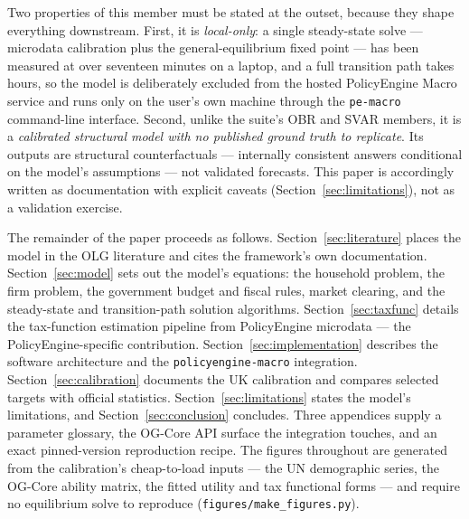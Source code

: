 Two properties of this member must be stated at the outset, because they shape everything downstream. First, it is \emph{local-only}: a single steady-state solve --- microdata calibration plus the general-equilibrium fixed point --- has been measured at over seventeen minutes on a laptop, and a full transition path takes hours, so the model is deliberately excluded from the hosted PolicyEngine Macro service and runs only on the user's own machine through the \texttt{pe-macro} command-line interface. Second, unlike the suite's OBR and SVAR members, it is a \emph{calibrated structural model with no published ground truth to replicate}. Its outputs are structural counterfactuals --- internally consistent answers conditional on the model's assumptions --- not validated forecasts. This paper is accordingly written as documentation with explicit caveats (Section~\ref{sec:limitations}), not as a validation exercise.

The remainder of the paper proceeds as follows. Section~\ref{sec:literature} places the model in the OLG literature and cites the framework's own documentation. Section~\ref{sec:model} sets out the model's equations: the household problem, the firm problem, the government budget and fiscal rules, market clearing, and the steady-state and transition-path solution algorithms. Section~\ref{sec:taxfunc} details the tax-function estimation pipeline from PolicyEngine microdata --- the PolicyEngine-specific contribution. Section~\ref{sec:implementation} describes the software architecture and the \texttt{policyengine-macro} integration. Section~\ref{sec:calibration} documents the UK calibration and compares selected targets with official statistics. Section~\ref{sec:limitations} states the model's limitations, and Section~\ref{sec:conclusion} concludes. Three appendices supply a parameter glossary, the OG-Core API surface the integration touches, and an exact pinned-version reproduction recipe. The figures throughout are generated from the calibration's cheap-to-load inputs --- the UN demographic series, the OG-Core ability matrix, the fitted utility and tax functional forms --- and require no equilibrium solve to reproduce (\texttt{figures/make\_figures.py}).
